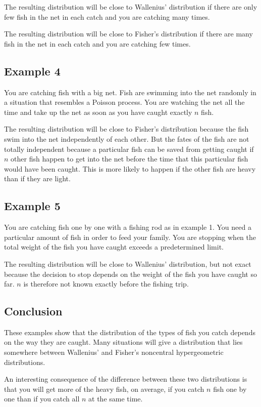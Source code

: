 \documentclass[a4paper]{article}
\begin{document}
The resulting distribution will be close to Wallenius' distribution if 
there are only few fish in the net in each catch and you are catching
many times.

The resulting distribution will be close to Fisher's distribution if 
there are many fish in the net in each catch and you are catching
few times.

\subsection{Example 4}
You are catching fish with a big net. Fish are swimming into the net
randomly in a situation that resembles a Poisson process. You are
watching the net all the time and take up the net as soon as you have
caught exactly $n$ fish.

The resulting distribution will be close to Fisher's distribution
because the fish swim into the net independently of each other.
But the fates of the fish are not totally independent because 
a particular fish can be saved from getting caught if $n$ other 
fish happen to get into the net before the time that this particular
fish would have been caught. This is more likely to happen if the other
fish are heavy than if they are light.

\subsection{Example 5}
You are catching fish one by one with a fishing rod as in example 1.
You need a particular amount of fish in order to feed your family.
You are stopping when the total weight of the fish you have caught
exceeds a predetermined limit.

The resulting distribution will be close to Wallenius' distribution,
but not exact because the decision to stop depends on the weight of
the fish you have caught so far. $n$ is therefore not known exactly
before the fishing trip.

\subsection{Conclusion}
These examples show that the distribution of the types of 
fish you catch depends on the way they are caught. Many situations
will give a distribution that lies somewhere between Wallenius'
and Fisher's noncentral hypergeometric distributions.

An interesting consequence of the difference between these two
distributions is that you will get more of the heavy fish, on average, 
if you catch $n$ fish one by one than if you catch all $n$
at the same time.
\end{document}
